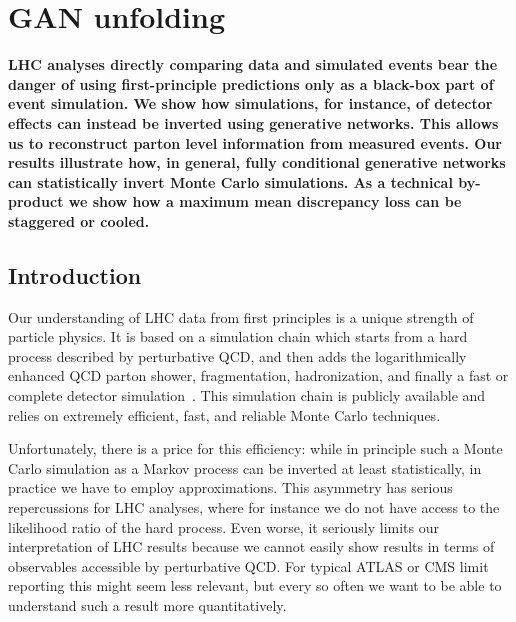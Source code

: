 %
%
%

\chapter{GAN unfolding}\label{chap:gan}
\enlargethispage{2ex}
\vspace*{-2pt}

\enlargethispage{2ex}

{\bf LHC analyses directly comparing data and simulated events bear the 
danger of using first-principle predictions only as a black-box part of event simulation. We show how simulations, for instance, of detector effects can instead be inverted using generative networks. This allows us to reconstruct parton level information from measured events. Our results illustrate how, in general, fully conditional generative networks can statistically invert Monte Carlo simulations. As a technical by-product we show how a maximum mean discrepancy loss can be staggered or cooled.}
  
\section{Introduction}
\label{sec:intro}

Our understanding of LHC data from first principles is a unique
strength of particle physics. It is based on a simulation chain which
starts from a hard process described by perturbative QCD, and then
adds the logarithmically enhanced QCD parton shower, fragmentation,
hadronization, and finally a fast or complete detector
simulation~\cite{black_book}. This simulation chain is publicly
available and relies on extremely efficient, fast, and reliable Monte
Carlo techniques.

Unfortunately, there is a price for this efficiency: while in
principle such a Monte Carlo simulation as a Markov process can be
inverted at least statistically, in practice we have to employ
approximations. This asymmetry has serious repercussions for LHC
analyses, where for instance we do not have access to the likelihood
ratio of the hard process. Even worse, it seriously limits our
interpretation of LHC results because we cannot easily show results in
terms of observables accessible by perturbative QCD. For typical ATLAS
or CMS limit reporting this might seem less relevant, but every so
often we want to be able to understand such a result more
quantitatively.

